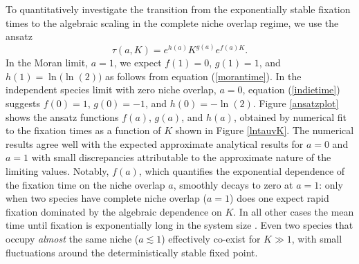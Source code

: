 To quantitatively investigate the transition from the exponentially stable fixation times to the algebraic scaling in the complete niche overlap regime, we use the ansatz
\begin{equation}
\tau(a,K) = e^{h(a)}K^{g(a)}e^{f(a)K}. \label{ansatz}
\end{equation}
In the  Moran limit, $a=1$, we expect $f(1)=0$, $g(1)=1$, and $h(1)=\ln\big(\ln(2)\big)$ as follows from equation (\ref{morantime}). In the independent species limit with zero niche overlap, $a=0$, equation (\ref{indietime}) suggests $f(0)=1$, $g(0)=-1$, and $h(0)=-\ln(2)$. 
Figure \ref{ansatzplot} shows the ansatz functions $f(a)$, $g(a)$, and $h(a)$, obtained by numerical fit to the fixation times as a function of $K$ shown in Figure \ref{lntauvK}. 
The numerical results agree well with the expected approximate analytical results for $a=0$ and $a=1$ with small discrepancies attributable to the approximate nature of the limiting values. 
Notably, $f(a)$, which quantifies the exponential dependence of the fixation time on the niche overlap $a$, smoothly decays to zero at $a=1$: only when two species have complete niche overlap ($a=1$) does one expect rapid fixation dominated by the algebraic dependence on $K$. 
In all other cases the mean time until fixation is exponentially long in the system size \cite{Hanggi1990,Ovaskainen2010}. 
Even two species that occupy \emph{almost} the same niche ($a\lesssim1$) effectively co-exist for $K\gg 1$, with small fluctuations around the deterministically stable fixed point. 



